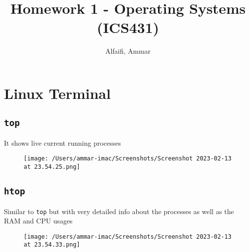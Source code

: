 \documentclass{article}
\title{Homework 1 - Operating Systems (ICS431)}
\author{Alfaifi, Ammar}
\date{}
\def\code#1{\texttt{#1}}
\begin{document}
\maketitle

\section{Linux Terminal}%
\subsection{\code{top}}%

It shows live current running processes

\begin{figure}[ht]
  \centering
  \texttt{[image: /Users/ammar-imac/Screenshots/Screenshot 2023-02-13 at 23.54.25.png]}
\end{figure}


\subsection{\code{htop}}%

Similar to \code{top} but with very detailed info about the processes as well as
the RAM and CPU usages

\begin{figure}[ht]
  \centering
  \texttt{[image: /Users/ammar-imac/Screenshots/Screenshot 2023-02-13 at 23.54.33.png]}
\end{figure}
\end{document}
